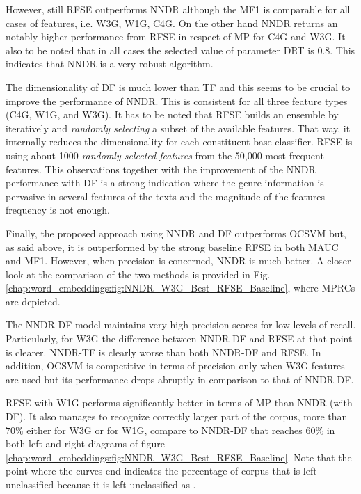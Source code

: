However, still RFSE outperforms NNDR although the MF1 is comparable for all cases of features, i.e. W3G, W1G, C4G. On the other hand NNDR returns an notably higher performance from RFSE in respect of MP for C4G and W3G. It also to be noted that in all cases the selected value of parameter DRT is 0.8. This indicates that NNDR is a very robust algorithm.

The dimensionality of DF is much lower than TF and this seems to be crucial to improve the performance of NNDR. This is consistent for all three feature types (C4G, W1G, and W3G). It has to be noted that RFSE builds an ensemble by iteratively and \textit{randomly selecting} a subset of the available features. That way, it internally reduces the dimensionality for each constituent base classifier. RFSE is using about 1000 \textit{randomly selected features} from the 50,000 most frequent features. This observations together with the improvement of the NNDR performance with DF is a strong indication where the genre information is pervasive in several features of the texts and the magnitude of the features frequency is not enough. 

Finally, the proposed approach using NNDR and DF outperforms OCSVM but, as said above, it is outperformed by the strong baseline RFSE in both MAUC and MF1. However, when precision is concerned, NNDR is much better. A closer look at  the comparison of the two methods is provided in Fig. \ref{chap:word_embeddings:fig:NNDR_W3G_Best_RFSE_Baseline}, where MPRCs are depicted. 

The NNDR-DF model maintains very high precision scores for low levels of recall. Particularly, for W3G the difference between NNDR-DF and RFSE at that point is clearer. NNDR-TF is clearly worse than both NNDR-DF and RFSE. In addition, OCSVM is competitive in terms of precision only when W3G features are used but its performance drops abruptly in comparison to that of NNDR-DF. 

RFSE with W1G performs significantly better in terms of MP than NNDR (with DF). It also manages to recognize correctly larger part of the corpus, more than $70\%$ either for W3G or for W1G, compare to NNDR-DF that reaches $60\%$ in both left and right diagrams of figure \ref{chap:word_embeddings:fig:NNDR_W3G_Best_RFSE_Baseline}. Note that the point where the curves end indicates the percentage of corpus that is left unclassified because it is left unclassified as .

